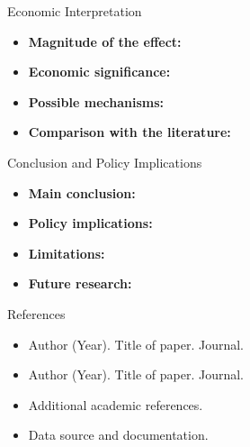 \documentclass[aspectratio=169,11pt]{beamer}
\begin{document}
\begin{frame}{Economic Interpretation}

    \begin{itemize}
        \item \textbf{Magnitude of the effect:}

        \item \textbf{Economic significance:}

        \item \textbf{Possible mechanisms:}

        \item \textbf{Comparison with the literature:}
    \end{itemize}

\end{frame}


\begin{frame}{Conclusion and Policy Implications}

    \begin{itemize}
        \item \textbf{Main conclusion:}

        \item \textbf{Policy implications:}

        \item \textbf{Limitations:}

        \item \textbf{Future research:}
    \end{itemize}

\end{frame}


\begin{frame}{References}

    \begin{itemize}
        \item Author (Year). Title of paper. Journal.
        \item Author (Year). Title of paper. Journal.
        \item Additional academic references.
        \item Data source and documentation.
    \end{itemize}


\end{frame}

\end{document}
